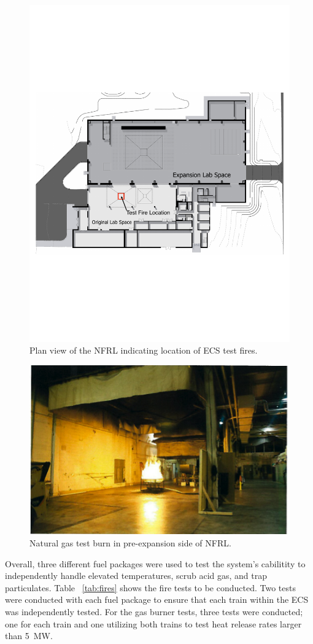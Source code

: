\documentclass[12pt,oneside]{book}
\begin{document}
\begin{figure}[!ht]
\centering
\includegraphics[width=.8\textwidth]{../Figures/plan_view2}
\caption {Plan view of the NFRL indicating location of ECS test fires.}
\label{fig:NFRL_plan}
\end{figure}

\begin{figure}[!ht]
\centering
\includegraphics[width=.6\textwidth]{../Figures/NFRL_Fire}
\caption {Natural gas test burn in pre-expansion side of NFRL.}
\label{fig:NFRL_fire}
\end{figure}

Overall, three different fuel packages were used to test the system's cabilitity to independently handle elevated temperatures, scrub acid gas, and trap particulates. Table ~\ref{tab:fires} shows the fire tests to be conducted. Two tests were conducted with each fuel package to ensure that each train within the ECS was independently tested. For the gas burner tests, three tests were conducted; one for each train and one utilizing both trains to test heat release rates larger than 5~MW.
\end{document}
